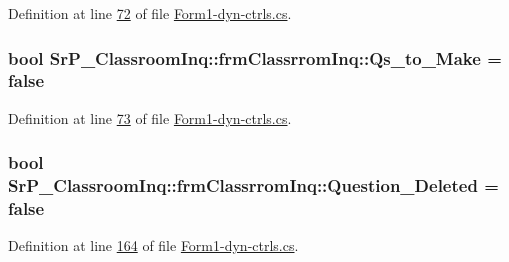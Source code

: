 \-Definition at line \hyperlink{_form1-dyn-ctrls_8cs_source_l00072}{72} of file \hyperlink{_form1-dyn-ctrls_8cs_source}{\-Form1-\/dyn-\/ctrls.\-cs}.

\hypertarget{class_sr_p___classroom_inq_1_1frm_classrrom_inq_a74b0b2afc18cdf1d19dc415ab870e68b}{
\subsubsection[{\-Qs\-\_\-to\-\_\-\-Make}]{\setlength{\rightskip}{0pt plus 5cm}bool {\bf \-Sr\-P\-\_\-\-Classroom\-Inq\-::frm\-Classrrom\-Inq\-::\-Qs\-\_\-to\-\_\-\-Make} = false}}
\label{class_sr_p___classroom_inq_1_1frm_classrrom_inq_a74b0b2afc18cdf1d19dc415ab870e68b}


\-Definition at line \hyperlink{_form1-dyn-ctrls_8cs_source_l00073}{73} of file \hyperlink{_form1-dyn-ctrls_8cs_source}{\-Form1-\/dyn-\/ctrls.\-cs}.

\hypertarget{class_sr_p___classroom_inq_1_1frm_classrrom_inq_a8f54ae3a0ea7bb9dafed984a53155fd8}{
\subsubsection[{\-Question\-\_\-\-Deleted}]{\setlength{\rightskip}{0pt plus 5cm}bool {\bf \-Sr\-P\-\_\-\-Classroom\-Inq\-::frm\-Classrrom\-Inq\-::\-Question\-\_\-\-Deleted} = false}}
\label{class_sr_p___classroom_inq_1_1frm_classrrom_inq_a8f54ae3a0ea7bb9dafed984a53155fd8}


\-Definition at line \hyperlink{_form1-dyn-ctrls_8cs_source_l00164}{164} of file \hyperlink{_form1-dyn-ctrls_8cs_source}{\-Form1-\/dyn-\/ctrls.\-cs}.

